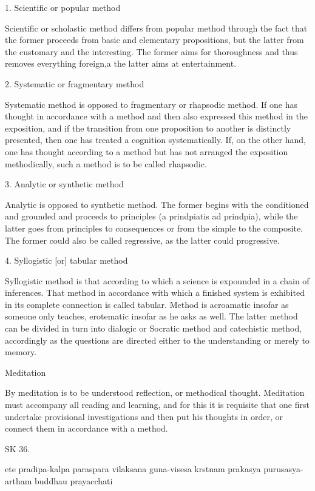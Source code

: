     1. Scientific or popular method

    Scientific or scholastic method differs from popular method through the
    fact that the former proceeds from basic and elementary propositions,
    but the latter from the customary and the interesting.
    The former aims for thoroughness and thus removes everything foreign,a
    the latter aims at entertainment.

    2. Systematic or fragmentary method

    Systematic method is opposed to fragmentary or rhapsodic method.
    If one has thought in accordance with a method and then also expressed this
    method in the exposition, and if the transition from one proposition to
    another is distinctly presented, then one has treated a cognition systematically.
    If, on the other hand, one has thought according to a method but has
    not arranged the exposition methodically, such a method is to be called rhapsodic.

    3. Analytic or synthetic method

    Analytic is opposed to synthetic method.
    The former begins with the conditioned and grounded and
    proceeds to principles (a prindpiatis ad prindpia),
    while the latter goes from principles to consequences or
    from the simple to the composite.
    The former could also be called regressive,
    as the latter could progressive.

    4. Syllogistic [or] tabular method

    Syllogistic method is that according to which a science is expounded in a chain of inferences.
    That method in accordance with which a finished system is exhibited in
    its complete connection is called tabular.
    Method is acroamatic insofar as someone only teaches,
    erotematic insofar as he asks as well.
    The latter method can be divided in turn into dialogic or Socratic method and
    catechistic method, accordingly as the questions are
    directed either to the understanding or merely to memory.

    Meditation

    By meditation is to be understood reflection, or methodical thought.
    Meditation must accompany all reading and learning, and for this it is requisite
    that one first undertake provisional investigations and then put his
    thoughts in order, or connect them in accordance with a method.

SK 36.

ete pradipa-kalpa paraspara vilaksana guna-visesa
krstnam prakasya purusasya-artham buddhau prayacchati

